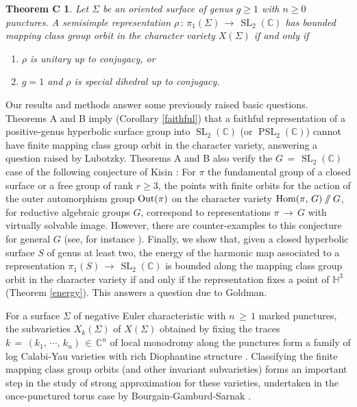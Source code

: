 \documentclass[reqno]{amsart}
\theoremstyle{plain}
\newtheorem*{theoremc}{Theorem C}
\theoremstyle{definition}
\theoremstyle{remark}
\newcommand{\C}{{\mathbb{C}}}
\DeclareMathOperator{\Hom}{Hom}
\DeclareMathOperator{\Out}{\textup{Out}}
\DeclareMathOperator{\PSL}{PSL}
\DeclareMathOperator{\SL}{SL}
\newcommand{\git}{\mathbin{
  \mathchoice{/\mkern-6mu/}%
    {/\mkern-6mu/}%
    {/\mkern-5mu/}%
    {/\mkern-5mu/}}}%
\newcommand\HHH{{\mathbb H}}
\begin{document}
\begin{theoremc}
Let $\Sigma$ be an oriented surface of genus $g\geq1$ with $n\geq0$ punctures. A semisimple
representation $\rho\,:\,\pi_1(\Sigma)\,\to\,\SL_2(\C)$ has bounded mapping class group
orbit in the character variety $X(\Sigma)$ if and only if
\begin{enumerate}
\item[(a)] $\rho$ is unitary up to conjugacy, or

\item[(b)] $g=1$ and $\rho$ is special dihedral up to conjugacy.
\end{enumerate} 
\end{theoremc}

Our results and methods answer some previously raised basic questions. Theorems A and B imply (Corollary 
\ref{faithful}) that a faithful representation of a positive-genus hyperbolic surface group 
into $\SL_2(\C)$ (or $\PSL_2(\C)$) cannot have finite mapping class group orbit in the 
character variety, answering a question raised by Lubotzky. Theorems A and B also verify the 
$G\,=\,\SL_2(\C)$ case of the following conjecture of Kisin \cite[Chapter 1]{sinz}: For $\pi$ the 
fundamental group of a closed surface or a free group of rank $r\geq3$, the points with finite 
orbits for the action of the outer automorphism group $\Out(\pi)$ on the character variety 
$\Hom(\pi,\,G)\git G$, for reductive algebraic groups $G$, correspond to representations $\pi\,\to\, 
G$ with virtually solvable image. However, there are counter-examples to this conjecture
for general $G$ (see, for instance \cite{KS,bkms}). Finally, we show that, given a closed hyperbolic 
surface $S$ of genus at least two, the energy of the harmonic map associated 
to a representation $\pi_1(S)\,\to\,\SL_2(\C)$ is bounded along the mapping class group orbit in the 
character variety if and only if the representation fixes a point of $\HHH^3$ (Theorem 
\ref{energy}). This answers a question due to Goldman.

For a surface $\Sigma$ of negative Euler characteristic with $n\,\geq\,1$ marked punctures, the 
subvarieties $X_k(\Sigma)$ of $X(\Sigma)$ obtained by fixing the traces 
$k\,=\,(k_1,\,\cdots,\,k_n)\,\in\,\C^n$ of local monodromy along the punctures form a family of log 
Calabi-Yau varieties \cite{whang} with rich Diophantine structure \cite{whang2}. Classifying 
the finite mapping class group orbits (and other invariant subvarieties) forms an important 
step in the study of strong approximation for these varieties, undertaken in the once-punctured 
torus case by Bourgain-Gamburd-Sarnak \cite{bgs}.
\end{document}

